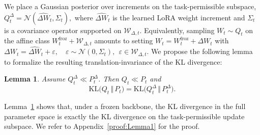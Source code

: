 \documentclass{article}
\theoremstyle{plain}
\newtheorem{lemma}[theorem]{Lemma}
\theoremstyle{definition}
\theoremstyle{remark}
\begin{document}
We place a Gaussian posterior over increments on the task-permissible subspace,
$
Q_t^\Delta = \mathcal N(\widehat{\Delta W}_t,\Sigma_t),
$
where $\widehat{\Delta W}_t$ is the learned LoRA weight increment and $\Sigma_t$ is a covariance operator supported on $\mathcal W_{\Delta,t}$. Equivalently, sampling $W_t \sim Q_t$ on the affine class $W^{\mathrm{froz}}_t+\mathcal W_{\Delta,t}$ amounts to setting $W_t = W^{\mathrm{froz}}_t + \Delta W_t$ with
$\Delta W_t = \widehat{\Delta W}_t + \varepsilon,\quad \varepsilon \sim \mathcal N(0,\Sigma_t),\ \ \varepsilon \in \mathcal W_{\Delta,t}.$
We propose the following lemma to formalize the resulting translation-invariance of the KL divergence:
\begin{lemma}
\label{lem:kl-decomp-pecl}
Assume $Q_t^\Delta \ll P_t^\Delta$. Then $Q_t \ll P_t$ and
\[
\mathrm{KL}\bigl(Q_t \,\Vert\, P_t\bigr)
=
\mathrm{KL}\bigl(Q_t^\Delta \,\Vert\, P_t^\Delta\bigr).
\]
\end{lemma}
Lemma~\ref{lem:kl-decomp-pecl} shows that, under a frozen backbone, the  KL divergence in the full parameter space is exactly the KL divergence on the task-permissible update subspace. We refer to Appendix~\ref{proof:Lemma1} for the proof.
\end{document}

